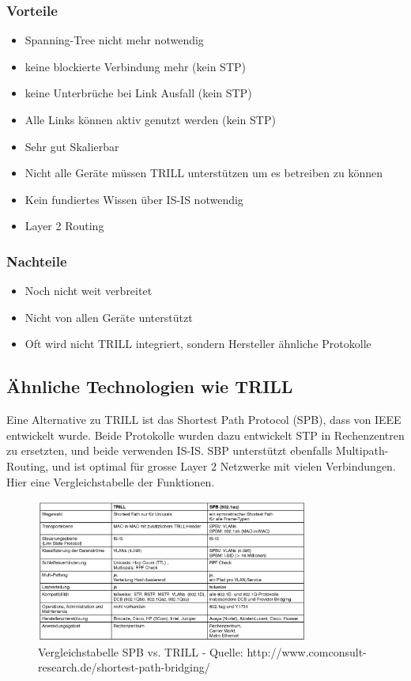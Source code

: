 \documentclass[a4,12pt]{scrartcl}
\begin{document}
\subsubsection{Vorteile}
\begin{itemize}
\item Spanning-Tree nicht mehr notwendig 
\item keine blockierte Verbindung mehr (kein STP) 
\item keine Unterbrüche bei Link Ausfall (kein STP)
\item Alle Links können aktiv genutzt werden (kein STP) 
\item Sehr gut Skalierbar 
\item Nicht alle Geräte müssen TRILL unterstützen um es betreiben zu können
\item Kein fundiertes Wissen über IS-IS notwendig   
\item Layer 2 Routing 
\end{itemize}
\subsubsection{Nachteile}
\begin{itemize}
\item Noch nicht weit verbreitet 
\item Nicht von allen Geräte unterstützt 
\item Oft wird nicht TRILL integriert, sondern Hersteller ähnliche Protokolle 
\end{itemize}

\subsection{Ähnliche Technologien wie TRILL} 
Eine Alternative zu TRILL ist das Shortest Path Protocol (SPB), dass von IEEE entwickelt wurde. Beide Protokolle wurden dazu entwickelt STP in Rechenzentren zu ersetzten, und beide verwenden IS-IS. SBP unterstützt ebenfalls Multipath-Routing, und ist optimal für grosse Layer 2 Netzwerke mit vielen Verbindungen. Hier eine Vergleichstabelle der Funktionen. 
\begin{figure} [H]
	\begin{center}
	\includegraphics[width=0.80\textwidth]{./pictures/vergleich_spb-trill.jpg}
	\caption{Vergleichstabelle SPB vs. TRILL - Quelle: http://www.comconsult-research.de/shortest-path-bridging/}
	\label{x}
	\end{center}
\end{figure}
\newpage
\end{document}
